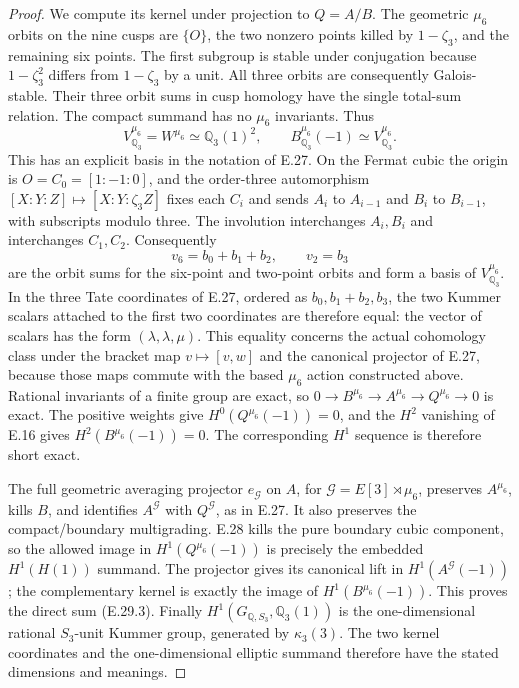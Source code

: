 \begin{proof}
We compute its kernel under projection to $Q=A/B$.
The geometric $\mu_6$ orbits on the nine cusps
are $\{O\}$, the two nonzero points killed by
$1-\zeta_3$, and the remaining six points.
The first subgroup is stable under conjugation
because $1-\zeta_3^2$ differs from $1-\zeta_3$
by a unit. All three orbits are consequently
Galois-stable. Their three orbit sums in cusp
homology have the single total-sum relation.
The compact summand has no $\mu_6$ invariants.
Thus
\[
 V_{\mathbb Q_3}^{\mu_6}
       =W^{\mu_6}\simeq\mathbb Q_3(1)^2,
 \qquad
 B_{\mathbb Q_3}^{\mu_6}(-1)
       \simeq V_{\mathbb Q_3}^{\mu_6}.
\]
This has an explicit basis in the notation of E.27.
On the Fermat cubic the origin is $O=C_0=[1:-1:0]$,
and the order-three automorphism
$[X:Y:Z]\mapsto[X:Y:\zeta_3 Z]$ fixes each $C_i$
and sends $A_i$ to $A_{i-1}$ and $B_i$ to $B_{i-1}$,
with subscripts modulo three. The involution interchanges
$A_i,B_i$ and interchanges $C_1,C_2$. Consequently
\[
 v_6=b_0+b_1+b_2,
       \qquad v_2=b_3
       \tag{E.29.6}
\]
are the orbit sums for the six-point and two-point orbits
and form a basis of $V_{\mathbb Q_3}^{\mu_6}$.
In the three Tate coordinates of E.27, ordered as
$b_0,b_1+b_2,b_3$, the two Kummer scalars attached
to the first two coordinates are therefore equal:
the vector of scalars has the form $(\lambda,\lambda,\mu)$.
This equality concerns the actual cohomology class under
the bracket map $v\mapsto[v,w]$ and the canonical
projector of E.27, because those maps commute with
the based $\mu_6$ action constructed above.
Rational invariants of a finite group are exact,
so $0\to B^{\mu_6}\to A^{\mu_6}\to Q^{\mu_6}
\to0$ is exact. The positive weights give
$H^0(Q^{\mu_6}(-1))=0$, and the $H^2$ vanishing
of E.16 gives $H^2(B^{\mu_6}(-1))=0$.
The corresponding $H^1$ sequence is therefore
short exact.

The full geometric averaging projector $e_{\mathcal G}$
on $A$, for $\mathcal G=E[3]\rtimes\mu_6$,
preserves $A^{\mu_6}$, kills $B$, and identifies
$A^{\mathcal G}$ with $Q^{\mathcal G}$, as in
E.27. It also preserves the compact/boundary
multigrading. E.28 kills the pure boundary
cubic component, so the allowed image in
$H^1(Q^{\mu_6}(-1))$ is precisely the embedded
$H^1(H(1))$ summand. The projector gives its
canonical lift in $H^1(A^{\mathcal G}(-1))$;
the complementary kernel is exactly the image
of $H^1(B^{\mu_6}(-1))$. This proves the direct
sum (E.29.3). Finally
$H^1(G_{\mathbb Q,S_3},\mathbb Q_3(1))$
is the one-dimensional rational $S_3$-unit
Kummer group, generated by $\kappa_3(3)$.
The two kernel coordinates and the one-dimensional
elliptic summand therefore have the stated
dimensions and meanings.
\end{proof}
